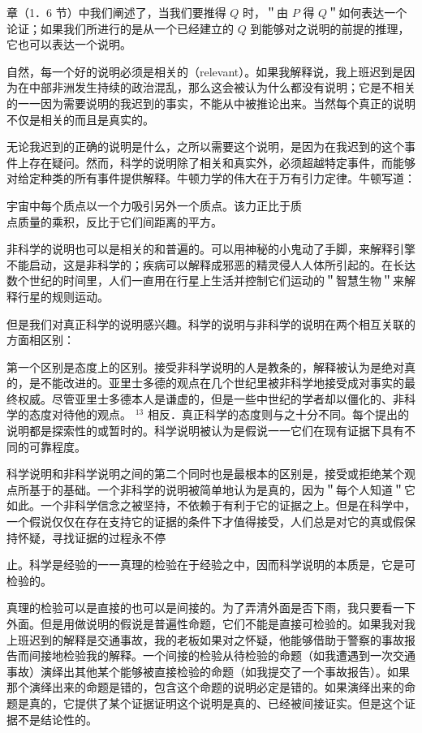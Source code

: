 章（1．6 节）中我们阐述了，当我们要推得 $Q$ 时，＂由 $P$ 得 $Q$＂如何表达一个论证；如果我们所进行的是从一个已经建立的 $Q$ 到能够对之说明的前提的推理，它也可以表达一个说明。

自然，每一个好的说明必须是相关的（relevant）。如果我解释说，我上班迟到是因为在中部非洲发生持续的政治混乱，那么这会被认为什么都没有说明；它是不相关的一一因为需要说明的我迟到的事实，不能从中被推论出来。当然每个真正的说明不仅是相关的而且是真实的。

无论我迟到的正确的说明是什么，之所以需要这个说明，是因为在我迟到的这个事件上存在疑问。然而，科学的说明除了相关和真实外，必须超越特定事件，而能够对给定种类的所有事件提供解释。牛顿力学的伟大在于万有引力定律。牛顿写道：

\begin{displayquote}
宇宙中每个质点以一个力吸引另外一个质点。该力正比于质\\
点质量的乘积，反比于它们间距离的平方。
\end{displayquote}

非科学的说明也可以是相关的和普遍的。可以用神秘的小鬼动了手脚，来解释引擎不能启动，这是非科学的；疾病可以解释成邪恶的精灵侵人人体所引起的。在长达数个世纪的时间里，人们一直用在行星上生活并控制它们运动的＂智慧生物＂来解释行星的规则运动。

但是我们对真正科学的说明感兴趣。科学的说明与非科学的说明在两个相互关联的方面相区别：

第一个区别是态度上的区别。接受非科学说明的人是教条的，解释被认为是绝对真的，是不能改进的。亚里士多德的观点在几个世纪里被非科学地接受成对事实的最终权威。尽管亚里士多德本人是谦虚的，但是一些中世纪的学者却以僵化的、非科学的态度对待他的观点。 ${ }^{13}$ 相反．真正科学的态度则与之十分不同。每个提出的说明都是探索性的或暂时的。科学说明被认为是假说一一它们在现有证据下具有不同的可靠程度。

科学说明和非科学说明之间的第二个同时也是最根本的区别是，接受或拒绝某个观点所基于的基础。一个非科学的说明被简单地认为是真的，因为＂每个人知道＂它如此。一个非科学信念之被坚持，不依赖于有利于它的证据之上。但是在科学中，一个假说仅仅在存在支持它的证据的条件下才值得接受，人们总是对它的真或假保持怀疑，寻找证据的过程永不停

止。科学是经验的一一真理的检验在于经验之中，因而科学说明的本质是，它是可检验的。

真理的检验可以是直接的也可以是间接的。为了弄清外面是否下雨，我只要看一下外面。但是用做说明的假说是普遍性命题，它们不能是直接可检验的。如果我对我上班迟到的解释是交通事故，我的老板如果对之怀疑，他能够借助于警察的事故报告而间接地检验我的解释。一个间接的检验从待检验的命题（如我遭遇到一次交通事故）演绎出其他某个能够被直接检验的命题（如我提交了一个事故报告）。如果那个演绎出来的命题是错的，包含这个命题的说明必定是错的。如果演绎出来的命题是真的，它提供了某个证据证明这个说明是真的、已经被间接证实。但是这个证据不是结论性的。

